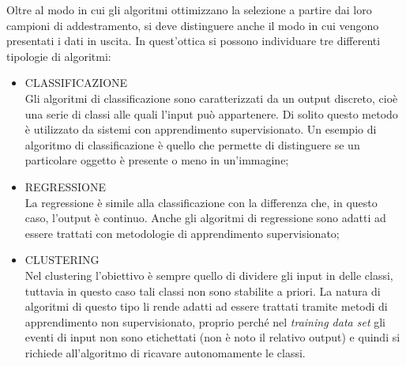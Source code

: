 \newpage

Oltre al modo in cui gli algoritmi ottimizzano la selezione a partire dai loro campioni di addestramento, si deve distinguere anche il modo in cui vengono presentati i dati in uscita. In quest'ottica si possono individuare tre differenti tipologie di algoritmi:
\begin{itemize}
	
	\item CLASSIFICAZIONE \\
	Gli algoritmi di classificazione sono caratterizzati da un output discreto, cioè una serie di classi alle quali l'input può appartenere. Di solito questo metodo è utilizzato da sistemi con apprendimento supervisionato. Un esempio di algoritmo di classificazione è quello che permette di distinguere se un particolare oggetto è presente o meno in un'immagine;
	
	\item REGRESSIONE \\
	La regressione è simile alla classificazione con la differenza che, in questo caso, l'output è continuo. Anche gli algoritmi di regressione sono adatti ad essere trattati con metodologie di apprendimento supervisionato;
	
	\item CLUSTERING \\
	Nel clustering l'obiettivo è sempre quello di dividere gli input in delle classi, tuttavia in questo caso tali classi non sono stabilite a priori. La natura di algoritmi di questo tipo li rende adatti ad essere trattati tramite metodi di apprendimento non supervisionato, proprio perché nel \textit{training data set} gli eventi di input non sono etichettati (non è noto il relativo output) e quindi si richiede all'algoritmo di ricavare autonomamente le classi.
	
\end{itemize}


